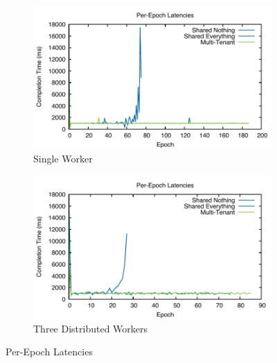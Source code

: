 \documentclass[../catalog.tex]{subfiles}
\begin{document}
\begin{figure}[h!]
  \begin{subfigure}{.5\textwidth}
    \includegraphics[width=1.0\linewidth]{results/multitenant_w1_p1/times}
    \caption{Single Worker}
  \end{subfigure}
  \begin{subfigure}{.5\textwidth}
    \includegraphics[width=1.0\linewidth]{results/multitenant_w1_p3/times}
    \caption{Three Distributed Workers}
  \end{subfigure}

  \caption{Per-Epoch Latencies}
\end{figure}
\end{document}

